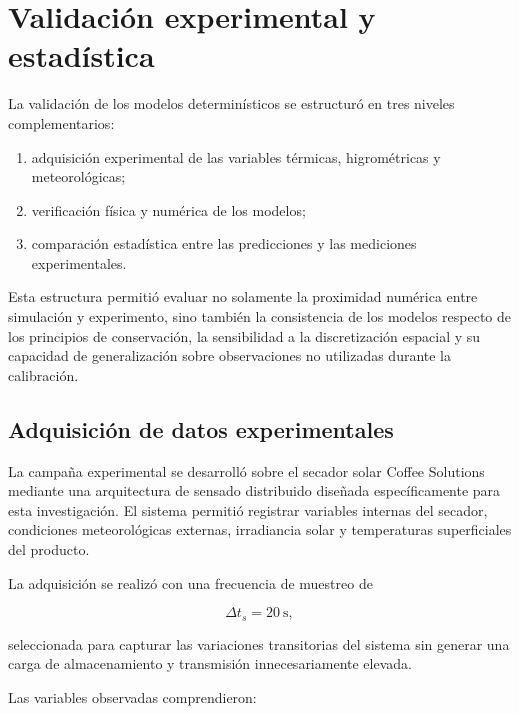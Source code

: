\section{Validación experimental y estadística}
\label{sec:validacion_experimental_estadistica}

La validación de los modelos determinísticos se estructuró en tres niveles complementarios:

\begin{enumerate}
    \item adquisición experimental de las variables térmicas, higrométricas y meteorológicas;
    \item verificación física y numérica de los modelos;
    \item comparación estadística entre las predicciones y las mediciones experimentales.
\end{enumerate}

Esta estructura permitió evaluar no solamente la proximidad numérica entre simulación y experimento, sino también la consistencia de los modelos respecto de los principios de conservación, la sensibilidad a la discretización espacial y su capacidad de generalización sobre observaciones no utilizadas durante la calibración.

\subsection{Adquisición de datos experimentales}
\label{subsec:adquisicion_datos_experimentales}

La campaña experimental se desarrolló sobre el secador solar Coffee Solutions mediante una arquitectura de sensado distribuido diseñada específicamente para esta investigación. El sistema permitió registrar variables internas del secador, condiciones meteorológicas externas, irradiancia solar y temperaturas superficiales del producto.

La adquisición se realizó con una frecuencia de muestreo de

\begin{equation}
\Delta t_s = 20~\mathrm{s},
\end{equation}

seleccionada para capturar las variaciones transitorias del sistema sin generar una carga de almacenamiento y transmisión innecesariamente elevada.

Las variables observadas comprendieron:

